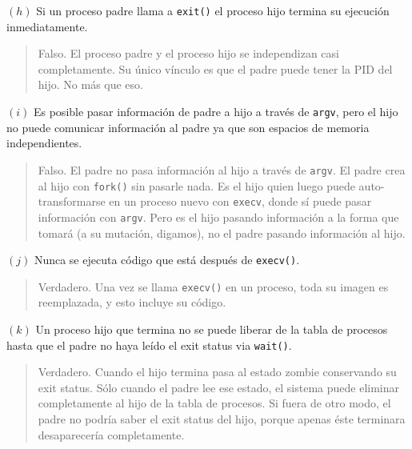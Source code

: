 \documentclass[12pt]{article}
\theoremstyle{definition}
\begin{document}
$(h)$ Si un proceso padre llama a \texttt{exit()} el proceso hijo termina su
ejecución inmediatamente. 


\small
\begin{quote}

Falso. El proceso padre y el proceso hijo se independizan casi completamente. Su
único vínculo es que el padre puede tener la PID del hijo.  No más que eso.

\end{quote}
\normalsize

$(i)$ Es posible pasar información de padre a hijo a través de \texttt{argv},
pero el hijo no puede comunicar información al padre ya que son espacios de
memoria independientes. 


\small
\begin{quote}

Falso. El padre no pasa información al hijo a través de \texttt{argv}. El padre
crea al hijo con \texttt{fork()} sin pasarle nada. Es el hijo quien luego puede
auto-transformarse en un proceso nuevo con \texttt{execv}, donde sí puede pasar
información con \texttt{argv}. Pero es el hijo pasando información a la forma
que tomará (a su mutación, digamos), no el padre pasando información al hijo. 

\end{quote}
\normalsize

$(j)$ Nunca se ejecuta código que está después de \texttt{execv()}.


\small
\begin{quote}

Verdadero. Una vez se llama \texttt{execv()} en un proceso, toda su imagen es
reemplazada, y esto incluye su código.

\end{quote}
\normalsize

$(k)$ Un proceso hijo que termina no se puede liberar de la tabla de procesos
hasta que el padre no haya leído el exit status via \texttt{wait()}.


\small
\begin{quote}

Verdadero. Cuando el hijo termina pasa al estado zombie conservando su exit
status. Sólo cuando el padre lee ese estado, el sistema puede eliminar
completamente al hijo de la tabla de procesos. Si fuera de otro modo, el padre
no podría saber el exit status del hijo, porque apenas éste terminara
desaparecería completamente.

\end{quote}
\normalsize
\end{document}
